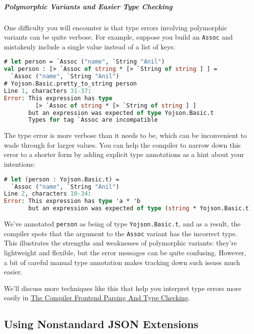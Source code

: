 \hypertarget{polymorphic-variants-and-easier-type-checking}{%
\subparagraph{Polymorphic Variants and Easier Type
Checking}\label{polymorphic-variants-and-easier-type-checking}}

One difficulty you will encounter is that type errors involving
polymorphic variants can be quite verbose. For example, suppose you
build an \passthrough{\lstinline!Assoc!} and mistakenly include a single
value instead of a list of keys:

\begin{lstlisting}[language=Caml]
# let person = `Assoc ("name", `String "Anil")
val person : [> `Assoc of string * [> `String of string ] ] =
  `Assoc ("name", `String "Anil")
# Yojson.Basic.pretty_to_string person
Line 1, characters 31-37:
Error: This expression has type
         [> `Assoc of string * [> `String of string ] ]
       but an expression was expected of type Yojson.Basic.t
       Types for tag `Assoc are incompatible
\end{lstlisting}

The type error is more verbose than it needs to be, which can be
inconvenient to wade through for larger values. You can help the
compiler to narrow down this error to a shorter form by adding explicit
type annotations as a hint about your intentions:

\begin{lstlisting}[language=Caml]
# let (person : Yojson.Basic.t) =
  `Assoc ("name", `String "Anil")
Line 2, characters 10-34:
Error: This expression has type 'a * 'b
       but an expression was expected of type (string * Yojson.Basic.t) list
\end{lstlisting}

We've annotated \passthrough{\lstinline!person!} as being of type
\passthrough{\lstinline!Yojson.Basic.t!}, and as a result, the compiler
spots that the argument to the \passthrough{\lstinline!Assoc!} variant
has the incorrect type. This illustrates the strengths and weaknesses of
polymorphic variants: they're lightweight and flexible, but the error
messages can be quite confusing. However, a bit of careful manual type
annotation makes tracking down such issues much easier.

We'll discuss more techniques like this that help you interpret type
errors more easily in
\href{compiler-frontend.html\#the-compiler-frontend-parsing-and-type-checking}{The
Compiler Frontend Parsing And Type Checking}.

\hypertarget{using-non-standard-json-extensions}{%
\subsection{Using Nonstandard JSON
Extensions}\label{using-non-standard-json-extensions}}

